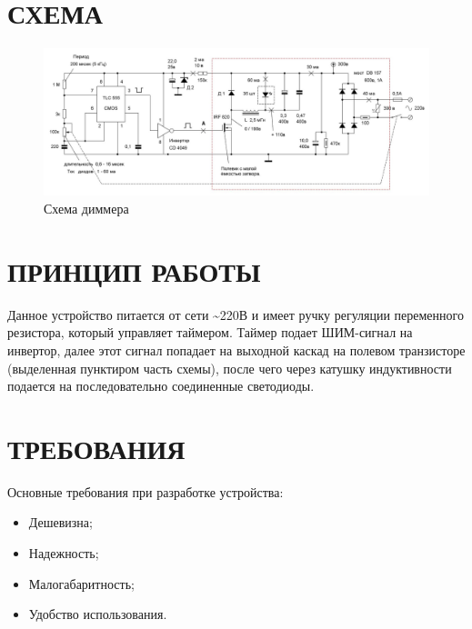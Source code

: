 \documentclass[a4paper,14pt]{article}
\begin{document}
\newpage


\section{СХЕМА}

\begin{figure}[H]
	\centering
	\includegraphics[width=1\linewidth]{image/sh.jpg}
	\caption{Схема диммера}
	\label{fig:sh}
\end{figure}

\newpage

\section{ПРИНЦИП РАБОТЫ}

Данное устройство питается от сети \textasciitilde 220В и имеет ручку регуляции переменного резистора, который управляет таймером.
Таймер подает ШИМ-сигнал на инвертор, далее этот сигнал попадает на выходной каскад на полевом транзисторе (выделенная пунктиром часть схемы), после чего через катушку индуктивности подается на последовательно соединенные светодиоды.


\newpage
\section{ТРЕБОВАНИЯ}

Основные требования при разработке устройства:

\begin{itemize}
	\item Дешевизна;
	\item Надежность;
	\item Малогабаритность;
	\item Удобство использования.
\end{itemize}


\end{document}
